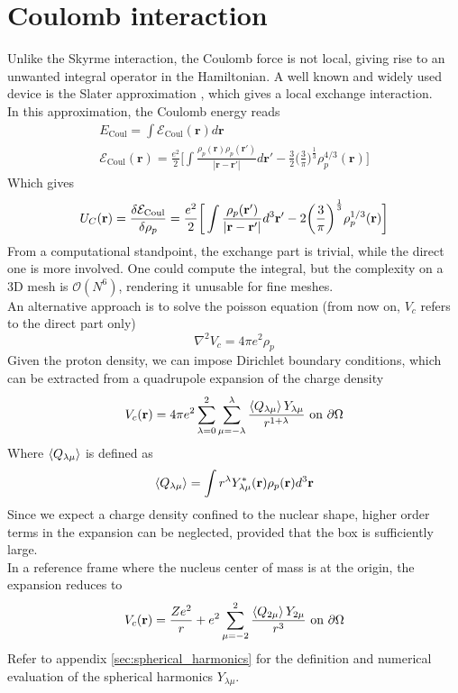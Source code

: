 \section{Coulomb interaction}
\label{sec:coulomb_treatment}
Unlike the Skyrme interaction, the Coulomb force is not local, giving rise to an unwanted integral operator in the Hamiltonian.
A well known and widely used device is the Slater approximation \cite{SlaterApp}, which gives a local exchange interaction.
\\In this approximation, the Coulomb energy reads
\begin{align*}
    E_\text{Coul} = \int \mathcal E_\text{Coul}(\mathbf r) d\bm r
    \\\mathcal E_\text{Coul}(\bm r) = \frac{e^2}{2}\bigg[\int  \frac{\rho_p(\mathbf r )\rho_p(\mathbf r ' )}{|\mathbf r-\mathbf r'|}d\mathbf r'  - \frac 3 2 \bigg(\frac 3 \pi \bigg) ^{\frac 1 3}\rho_p^{4/3}(\mathbf r)\bigg]
\end{align*}
Which gives
\begin{equation}
    U_{C}(\mathbf r) = \fdv{\mathcal E_\text{Coul}}{\rho_p} = \frac{e^2}{2}\bigg[\int \frac{\rho_p(\mathbf r ')}{|\mathbf r-\mathbf r'|} d^3 \mathbf r' - 2\bigg(\frac 3 \pi \bigg) ^{\frac 1 3} \rho_p^{1/3}(\mathbf r ) \bigg]
\end{equation}
From a computational standpoint, the exchange part is trivial, while the direct one is more involved.
One could compute the integral, but the complexity on a 3D mesh is $\mathcal O(N^6)$, rendering it unusable for fine meshes.
\\An alternative approach is to solve the poisson equation (from now on, $V_c$ refers to the direct part only)
\begin{equation}
    \label{eq:poisson}
    \nabla^2 V_c = 4\pi e^2 \rho_p
\end{equation}
Given the proton density, we can impose Dirichlet boundary conditions, which can be extracted from a quadrupole expansion of the charge density \cite{Jackson1998}
\begin{equation}
V_c (\mathbf r) = 4\pi e^2 \sum_{\lambda=0}^2\sum_{\mu=-\lambda}^\lambda \frac{\expval{Q_{\lambda\mu}} Y_{\lambda\mu}}{r^{1+\lambda}}\text{ on }\partial \Omega
\end{equation}
Where $\expval{Q_{\lambda\mu}}$ is defined as 
\begin{equation}
    \expval{Q_{\lambda\mu}} = \int r^\lambda Y_{\lambda\mu}^* (\mathbf r)\rho_p(\mathbf r ) d^3 \mathbf r
\end{equation}
Since we expect a charge density confined to the nuclear shape, higher order terms in the expansion can be neglected, provided that the box is sufficiently large.
\\In a reference frame where the nucleus center of mass is at the origin, the expansion reduces to
\begin{equation}
    V_{c}(\mathbf r ) = \frac{Ze^2}{r} + e^2\sum_{\mu=-2}^{2}\frac{\expval{Q_{2\mu}}Y_{2\mu}}{r^3} \text{ on } \partial \Omega
\end{equation}
Refer to appendix \ref{sec:spherical_harmonics} for the definition and numerical evaluation of the spherical harmonics $Y_{\lambda\mu}$.